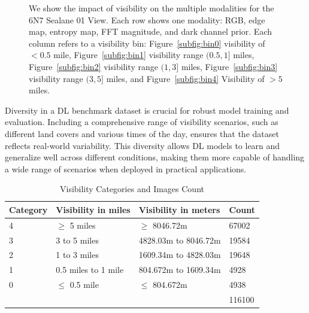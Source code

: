 \begin{figure}
{    \label{subfig:bin3}
    }

    \caption{We show the impact of visibility on the multiple modalities for the 6N7 Sealane 01 View. Each row shows one modality: RGB, edge map, entropy map, FFT magnitude, and dark channel prior. Each column refers to a visibility bin: Figure~\ref{subfig:bin0} visibility of $< 0.5$ mile, Figure~\ref{subfig:bin1} visibility range $(0.5, 1]$ miles, Figure~\ref{subfig:bin2} visibility range $(1, 3]$ miles, Figure~\ref{subfig:bin3} visibility range $(3, 5]$ miles, and Figure~\ref{subfig:bin4} Visibility of $> 5$ miles. }
    \label{fig:impact_vis_deg_features}
\end{figure}

Diversity in a DL benchmark dataset is crucial for robust model training and evaluation. Including a comprehensive range of visibility scenarios, such as different land covers and various times of the day, ensures that the dataset reflects real-world variability. This diversity allows DL models to learn and generalize well across different conditions, making them more capable of handling a wide range of scenarios when deployed in practical applications.



\begin{table}[htbp]
\centering
\caption{Visibility Categories and Images Count}
\label{tab:vis_img_count}
\begin{tabular}{|l|l|l|l|}
\hline
Category & Visibility in miles  & Visibility in meters & Count  \\ \hline
4        & $\geq$ 5 miles             &     $\geq$ 8046.72m                 & 67002  \\ \hline
3        & 3 to 5 miles         &      4828.03m to  8046.72m        & 19584  \\ \hline
2        & 1 to 3 miles         &            1609.34m to 4828.03m         & 19648  \\ \hline
1        & 0.5 miles to 1 mile  &               804.672m to 1609.34m      & 4928  \\ \hline
0        & $\leq$ 0.5 mile   &     $\leq$ 804.672m                 & 4938  \\ \hline
        &    &                      &  116100  \\ \hline
\end{tabular}
\end{table}


